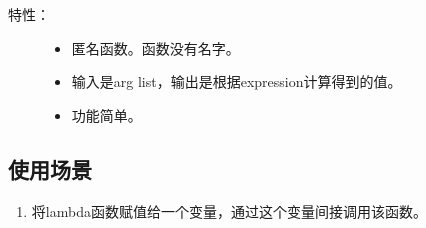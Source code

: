 \documentclass[letterpaper,10pt,english]{sphinxmanual}
\begin{document}
%
\begin{sphinxVerbatim}[commandchars=\\\{\}]
 \PYG{p}{[}\PYG{p}{[}   \PYG{p}{]}\PYG{p}{]} 
\end{sphinxVerbatim}
\begin{description}
\item[{特性：}] \leavevmode\begin{itemize}
\item {} 
匿名函数。函数没有名字。

\item {} 
输入是arg list，输出是根据expression计算得到的值。

\item {} 
功能简单。

\end{itemize}

\end{description}


\subsection{使用场景}
\label{\detokenize{python/06_lambda:id1}}\begin{enumerate}
\item {} 
将lambda函数赋值给一个变量，通过这个变量间接调用该函数。

\end{enumerate}
\end{document}
